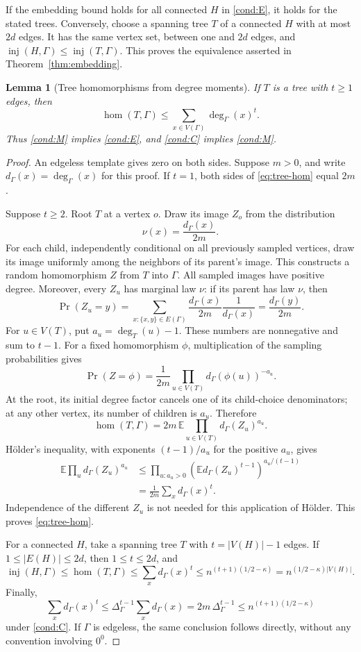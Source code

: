 \documentclass[11pt]{article}
\newcommand{\E}{\mathbb E}
\newcommand{\inj}{\operatorname{inj}}
\renewcommand{\hom}{\operatorname{hom}}
\newcommand{\1}{\mathbf 1}
\newtheorem{lemma}[theorem]{Lemma}
\theoremstyle{definition}
\theoremstyle{remark}
\numberwithin{equation}{section}
\begin{document}
If the embedding bound holds for all connected $H$ in \eqref{cond:E}, it holds for the stated trees. Conversely, choose a spanning tree $T$ of a connected $H$ with at most $2d$ edges. It has the same vertex set, between one and $2d$ edges, and $\inj(H,\Gamma)\le\inj(T,\Gamma)$. This proves the equivalence asserted in Theorem~\ref{thm:embedding}.

\begin{lemma}[Tree homomorphisms from degree moments]\label{lem:tree-moments}
If $T$ is a tree with $t\ge1$ edges, then
\begin{equation}\label{eq:tree-hom}
 \hom(T,\Gamma)\le\sum_{x\in V(\Gamma)}\deg_\Gamma(x)^t.
\end{equation}
Thus \eqref{cond:M} implies \eqref{cond:E}, and \eqref{cond:C} implies \eqref{cond:M}.
\end{lemma}
\begin{proof}
An edgeless template gives zero on both sides. Suppose $m>0$, and write $d_\Gamma(x)=\deg_\Gamma(x)$ for this proof. If $t=1$, both sides of \eqref{eq:tree-hom} equal $2m$.

Suppose $t\ge2$. Root $T$ at a vertex $o$. Draw its image $Z_o$ from the distribution
\[
 \nu(x)=\frac{d_\Gamma(x)}{2m}.
\]
For each child, independently conditional on all previously sampled vertices, draw its image uniformly among the neighbors of its parent's image. This constructs a random homomorphism $Z$ from $T$ into $\Gamma$. All sampled images have positive degree. Moreover, every $Z_u$ has marginal law $\nu$: if its parent has law $\nu$, then
\[
 \Pr(Z_u=y)=\sum_{x:\{x,y\}\in E(\Gamma)}
       \frac{d_\Gamma(x)}{2m}\frac1{d_\Gamma(x)}
       =\frac{d_\Gamma(y)}{2m}.
\]
For $u\in V(T)$, put $a_u=\deg_T(u)-1$. These numbers are nonnegative and sum to $t-1$. For a fixed homomorphism $\phi$, multiplication of the sampling probabilities gives
\[
 \Pr(Z=\phi)=\frac1{2m}
       \prod_{u\in V(T)}d_\Gamma(\phi(u))^{-a_u}.
\]
At the root, its initial degree factor cancels one of its child-choice denominators; at any other vertex, its number of children is $a_u$. Therefore
\[
 \hom(T,\Gamma)=2m\,\E\prod_{u\in V(T)}d_\Gamma(Z_u)^{a_u}.
\]
H\"older's inequality, with exponents $(t-1)/a_u$ for the positive $a_u$, gives
\begin{align*}
 \E\prod_u d_\Gamma(Z_u)^{a_u}
 &\le\prod_{u:a_u>0}
       \left(\E d_\Gamma(Z_u)^{t-1}\right)^{a_u/(t-1)}\\
 &=\frac1{2m}\sum_xd_\Gamma(x)^t.
\end{align*}
Independence of the different $Z_u$ is not needed for this application of H\"older. This proves \eqref{eq:tree-hom}.

For a connected $H$, take a spanning tree $T$ with $t=|V(H)|-1$ edges. If $1\le|E(H)|\le2d$, then $1\le t\le2d$, and
\[
 \inj(H,\Gamma)\le\hom(T,\Gamma)
 \le\sum_xd_\Gamma(x)^t
 \le n^{(t+1)(1/2-\kappa)}
 =n^{(1/2-\kappa)|V(H)|}.
\]
Finally,
\[
 \sum_xd_\Gamma(x)^t
 \le\Delta_\Gamma^{t-1}\sum_xd_\Gamma(x)
 =2m\,\Delta_\Gamma^{t-1}
 \le n^{(t+1)(1/2-\kappa)}
\]
under \eqref{cond:C}. If $\Gamma$ is edgeless, the same conclusion follows directly, without any convention involving $0^0$.
\end{proof}
\end{document}

